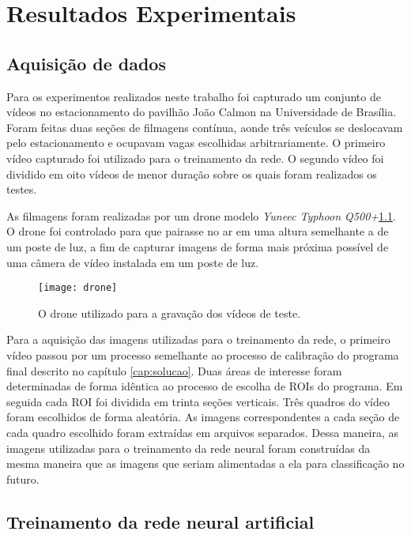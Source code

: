 \chapter{Resultados Experimentais}\label{cap:results}

\section{Aquisição de dados}

Para os experimentos realizados neste trabalho foi capturado um conjunto de vídeos no estacionamento do pavilhão João Calmon na Universidade de Brasília. Foram feitas duas seções de filmagens contínua, aonde três veículos se deslocavam pelo estacionamento e ocupavam vagas escolhidas arbitrariamente. O primeiro vídeo capturado foi utilizado para o treinamento da rede. O segundo vídeo foi dividido em oito vídeos de menor duração sobre os quais foram realizados os testes.

As filmagens foram realizadas por um drone modelo \textit{Yuneec Typhoon Q500+}\ref{fig:drone}. O drone foi controlado para que pairasse no ar em uma altura semelhante a de um poste de luz, a fim de capturar imagens de forma mais próxima possível de uma câmera de vídeo instalada em um poste de luz.

\begin{figure}
\centering
\texttt{[image: drone]}
\label{fig:drone}
\caption{O drone utilizado para a gravação dos vídeos de teste.}
\centering
\end{figure}

Para a aquisição das imagens utilizadas para o treinamento da rede, o primeiro vídeo passou por um processo semelhante ao processo de calibração do programa final descrito no capítulo \ref{cap:solucao}. Duas áreas de interesse foram determinadas de forma idêntica ao processo de escolha de ROIs do programa. Em seguida cada ROI foi dividida em trinta seções verticais. Três quadros do vídeo foram escolhidos de forma aleatória. As imagens correspondentes a cada seção de cada quadro escolhido foram extraídas em arquivos separados. Dessa maneira, as imagens utilizadas para o treinamento da rede neural foram construídas da mesma maneira que as imagens que seriam alimentadas a ela para classificação no futuro.

\section{Treinamento da rede neural artificial}

